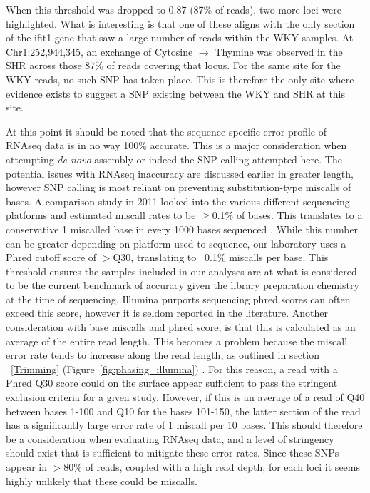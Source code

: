 When this threshold was dropped to 0.87 (87\% of reads), two more loci were highlighted. What is interesting is that one of these aligns with the only section of the ifit1 gene that saw a large number of reads within the WKY samples. At Chr1:252,944,345, an exchange of Cytosine $\rightarrow$ Thymine was observed in the SHR across those 87\% of reads covering that locus. For the same site for the WKY reads, no such SNP has taken place. This is therefore the only site where evidence exists to suggest a SNP existing between the WKY and SHR at this site.
  
At this point it should be noted that the sequence-specific error profile of RNAseq data is in no way 100\% accurate. This is a major consideration when attempting \textit{de novo} assembly or indeed the SNP calling attempted here. The potential issues with RNAseq inaccuracy are discussed earlier in greater length, however SNP calling is most reliant on preventing substitution-type miscalls of bases. A comparison study in 2011 looked into the various different sequencing platforms and estimated miscall rates to be $\geq$0.1\% of bases. This translates to a conservative 1 miscalled base in every 1000 bases sequenced \cite{Glenn2011}. While this number can be greater depending on platform used to sequence, our laboratory uses a Phred cutoff score of $>$Q30, translating to ~0.1\% miscalls per base. This threshold ensures the samples included in our analyses are at what is considered to be the current benchmark of accuracy given the library preparation chemistry at the time of sequencing. Illumina purports sequencing phred scores can often exceed this score, however it is seldom reported in the literature. Another consideration with base miscalls and phred score, is that this is calculated as an average of the entire read length. This becomes a problem because the miscall error rate tends to increase along the read length, as outlined in section ~\ref{Trimming} (Figure~\ref{fig:phasing_illumina}) \cite{Shendure2008}. For this reason, a read with a Phred Q30 score could on the surface appear sufficient to pass the stringent exclusion criteria for a given study. However, if this is an average of a read of Q40 between bases 1-100 and Q10 for the bases 101-150, the latter section of the read has a significantly large error rate of 1 miscall per 10 bases. This should therefore be a consideration when evaluating RNAseq data, and a level of stringency should exist that is sufficient to mitigate these error rates. Since these SNPs appear in $>$80\% of reads, coupled with a high read depth, for each loci it seems highly unlikely that these could be miscalls.








